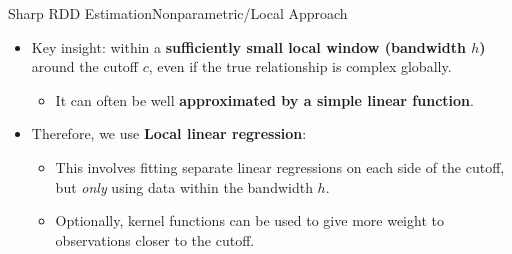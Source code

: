 \documentclass[hyperref={pdfpagelabels=false}]{beamer}
\begin{document}
\begin{frame}{Sharp RDD Estimation}{Nonparametric/Local Approach}
\begin{itemize}
	\item Key insight: within a \textbf{sufficiently small local window (bandwidth $h$)} around the cutoff $c$, even if the true relationship is complex globally.
	\begin{itemize}
		\vspace{0.2cm}
	\item It can often be well \textbf{approximated by a simple linear function}.
	\vspace{0.2cm}
\end{itemize}
	\item Therefore, we use \textbf{Local linear regression}:
			\vspace{0.2cm}
	\begin{itemize}
		\item This involves fitting separate linear regressions on each side of the cutoff, but \textit{only} using data within the bandwidth $h$.
		\vspace{0.2cm}
		\item Optionally, kernel functions can be used to give more weight to observations closer to the cutoff.
	\end{itemize}
\end{itemize}
\end{frame}
\end{document}
